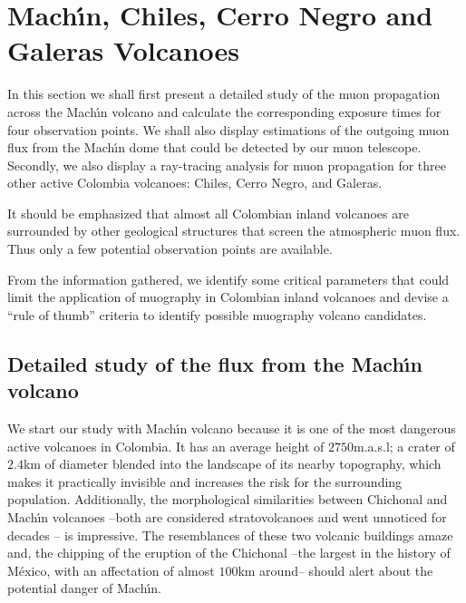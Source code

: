 \documentclass[letterpaper,10pt,titlepage,linenumber]{article}
\begin{document}
\section{Mach\'{\i}n, Chiles, Cerro Negro and Galeras Volcanoes}
\label{Results}
 In this section we shall first present a detailed study of the muon propagation across the Mach\'{\i}n volcano and calculate the corresponding exposure times for four observation points. We shall also display estimations of the outgoing muon flux from the Mach\'{\i}n dome that could be detected by our muon telescope. Secondly, we also display a ray-tracing analysis for muon propagation for three other active Colombia volcanoes: Chiles, Cerro Negro, and Galeras. 
 
 It should be emphasized that almost all Colombian inland volcanoes are surrounded by other geological structures that screen the atmospheric muon flux. Thus only a few potential observation points are available. 
 
 From the information gathered, we identify some critical parameters that could limit the application of muography in Colombian inland volcanoes and devise a ``rule of thumb'' criteria to identify possible muography volcano candidates.

\subsection{Detailed study of the flux from the Mach\'{\i}n volcano}
\label{MachinStudy}
We start our study with Mach\'{\i}n volcano because it is one of the most dangerous active volcanoes in Colombia. It has an average height of $2750$m.a.s.l; a crater of $2.4$km of diameter blended into the landscape of its nearby topography, which makes it practically invisible and  increases the risk for the surrounding population.
Additionally, the morphological similarities between Chichonal and Mach\'{\i}n volcanoes --both are considered stratovolcanoes and went unnoticed for decades \cite{Rubio1985, Macias2006}-- is impressive. The resemblances of these two volcanic buildings amaze and, the chipping of the eruption of the Chichonal  --the largest in the history of M\'exico, with an affectation of almost $100$km around-- should alert about the potential danger of Mach\'{\i}n.
\end{document}
